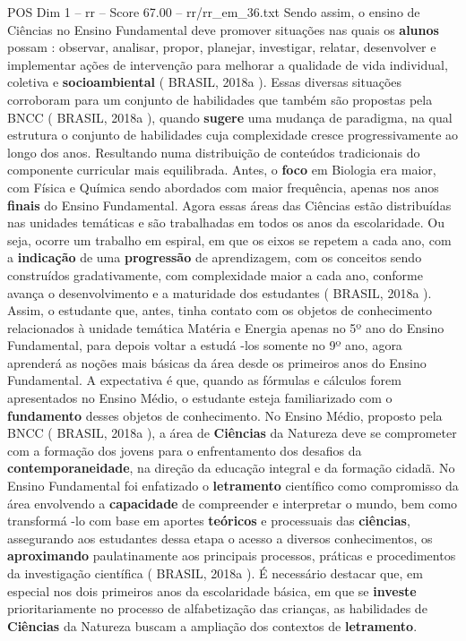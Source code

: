 \begin{textsample}{POS Dim 1 – rr – Score 67.00 – rr/rr\_em\_36.txt}
Sendo assim, o ensino de Ciências no Ensino Fundamental deve promover situações nas quais os \textbf{alunos} possam : observar, analisar, propor, planejar, investigar, relatar, desenvolver e implementar ações de intervenção para melhorar a qualidade de vida individual, coletiva e \textbf{socioambiental} ( BRASIL, 2018a ).
Essas diversas situações corroboram para um conjunto de habilidades que também são propostas pela BNCC ( BRASIL, 2018a ), quando \textbf{sugere} uma mudança de paradigma, na qual estrutura o conjunto de habilidades cuja complexidade cresce progressivamente ao longo dos anos.
Resultando numa distribuição de conteúdos tradicionais do componente curricular mais equilibrada.
Antes, o \textbf{foco} em Biologia era maior, com Física e Química sendo abordados com maior frequência, apenas nos anos \textbf{finais} do Ensino Fundamental.
Agora essas áreas das Ciências estão distribuídas nas unidades temáticas e são trabalhadas em todos os anos da escolaridade.
Ou seja, ocorre um trabalho em espiral, em que os eixos se repetem a cada ano, com a \textbf{indicação} de uma \textbf{progressão} de aprendizagem, com os conceitos sendo construídos gradativamente, com complexidade maior a cada ano, conforme avança o desenvolvimento e a maturidade dos estudantes ( BRASIL, 2018a ).
Assim, o estudante que, antes, tinha contato com os objetos de conhecimento relacionados à unidade temática Matéria e Energia apenas no 5º ano do Ensino Fundamental, para depois voltar a estudá -los somente no 9º ano, agora aprenderá as noções mais básicas da área desde os primeiros anos do Ensino Fundamental.
A expectativa é que, quando as fórmulas e cálculos forem apresentados no Ensino Médio, o estudante esteja familiarizado com o \textbf{fundamento} desses objetos de conhecimento.
No Ensino Médio, proposto pela BNCC ( BRASIL, 2018a ), a área de \textbf{Ciências} da Natureza deve se comprometer com a formação dos jovens para o enfrentamento dos desafios da \textbf{contemporaneidade}, na direção da educação integral e da formação cidadã.
No Ensino Fundamental foi enfatizado o \textbf{letramento} científico como compromisso da área envolvendo a \textbf{capacidade} de compreender e interpretar o mundo, bem como transformá -lo com base em aportes \textbf{teóricos} e processuais das \textbf{ciências}, assegurando aos estudantes dessa etapa o acesso a diversos conhecimentos, os \textbf{aproximando} paulatinamente aos principais processos, práticas e procedimentos da investigação científica ( BRASIL, 2018a ).
É necessário destacar que, em especial nos dois primeiros anos da escolaridade básica, em que se \textbf{investe} prioritariamente no processo de alfabetização das crianças, as habilidades de \textbf{Ciências} da Natureza buscam a ampliação dos contextos de \textbf{letramento}.

\end{textsample}
